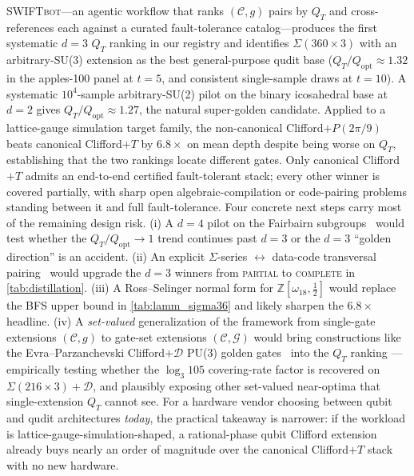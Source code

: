 \documentclass[twocolumn,superscriptaddress,showpacs,nofootinbib,notitlepage,preprintnumbers,secnumarabic,amssymb, nobibnotes, aps, prd]{revtex4-2}
\newcommand{\QT}{Q_{T}}              %
\newcommand{\Popt}{Q_{\mathrm{opt}}} %
\newcommand{\Sigmathree}[1]{\Sigma(#1\!\times\!3)} %
\newcommand{\SWIFTbot}{\textsc{SWIFTbot}\xspace}
\begin{document}
\SWIFTbot---an agentic workflow that ranks $(\mathcal{C},g)$ pairs by $\QT$ and cross-references each against a curated fault-tolerance catalog---produces the first systematic $d=3$ $\QT$ ranking in our registry and identifies $\Sigmathree{360}$ with an arbitrary-SU(3) extension as the best general-purpose qudit base ($\QT/\Popt\approx 1.32$ in the apples-100 panel at $t=5$, and consistent single-sample draws at $t=10$). A systematic $10^4$-sample arbitrary-SU(2) pilot on the binary icosahedral base at $d=2$ gives $\QT/\Popt \approx 1.27$, the natural super-golden candidate. Applied to a lattice-gauge simulation target family, the non-canonical Clifford$+P(2\pi/9)$ beats canonical Clifford$+T$ by $6.8\times$ on mean depth despite being worse on $\QT$, establishing that the two rankings locate different gates. Only canonical Clifford$+T$ admits an end-to-end certified fault-tolerant stack; every other winner is covered partially, with sharp open algebraic-compilation or code-pairing problems standing between it and full fault-tolerance. Four concrete next steps carry most of the remaining design risk. (i) A $d=4$ pilot on the Fairbairn subgroups~\cite{Fairbairn:1964} would test whether the $\QT/\Popt \to 1$ trend continues past $d=3$ or the $d=3$ ``golden direction'' is an accident. (ii) An explicit $\Sigma$-series $\leftrightarrow$ data-code transversal pairing~\cite{DenysLeverrier:2024,KubischtaTeixeira:2024,OuyangJingBrennen:2024} would upgrade the $d=3$ winners from \textsc{partial} to \textsc{complete} in \cref{tab:distillation}. (iii) A Ross--Selinger normal form for $\mathbb{Z}[\omega_{18},\tfrac{1}{2}]$ would replace the BFS upper bound in \cref{tab:lamm_sigma36} and likely sharpen the $6.8\times$ headline. (iv) A \emph{set-valued} generalization of the framework from single-gate extensions $(\mathcal{C}, g)$ to gate-set extensions $(\mathcal{C}, \mathcal{G})$ would bring constructions like the Evra--Parzanchevski Clifford$+\mathcal{D}$ PU(3) golden gates~\cite{EvraParzanchevski:2024cliffordT} into the $\QT$ ranking --- empirically testing whether the $\log_3 105$ covering-rate factor is recovered on $\Sigmathree{216}+\mathcal{D}$, and plausibly exposing other set-valued near-optima that single-extension $\QT$ cannot see. For a hardware vendor choosing between qubit and qudit architectures \emph{today}, the practical takeaway is narrower: if the workload is lattice-gauge-simulation-shaped, a rational-phase qubit Clifford extension already buys nearly an order of magnitude over the canonical Clifford$+T$ stack with no new hardware.
\end{document}
